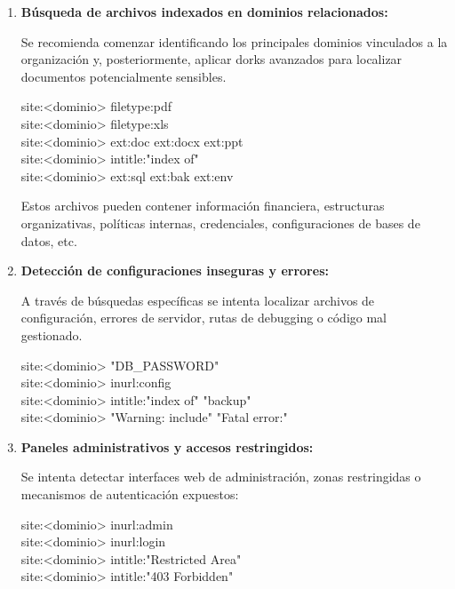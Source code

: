 \documentclass[a4paper, 11pt]{article}
\begin{document}
\begin{enumerate}
    \item \textbf{Búsqueda de archivos indexados en dominios relacionados:}

    Se recomienda comenzar identificando los principales dominios vinculados a la organización y, posteriormente, aplicar dorks avanzados para localizar documentos potencialmente sensibles.

    \begin{tcolorbox}[colback=yellow!20!white, colframe=orange!80!black, title={Dorks para documentos y configuraciones}]
    \small
    site:<dominio> filetype:pdf \\
    site:<dominio> filetype:xls \\
    site:<dominio> ext:doc \textbar{} ext:docx \textbar{} ext:ppt \\
    site:<dominio> intitle:"index of" \\
    site:<dominio> ext:sql \textbar{} ext:bak \textbar{} ext:env
    \end{tcolorbox}

    Estos archivos pueden contener información financiera, estructuras organizativas, políticas internas, credenciales, configuraciones de bases de datos, etc.

    \item \textbf{Detección de configuraciones inseguras y errores:}

    A través de búsquedas específicas se intenta localizar archivos de configuración, errores de servidor, rutas de debugging o código mal gestionado.

 
\begin{tcolorbox}[colback=yellow!20!white, colframe=orange!80!black, title={Dorks para errores y configuraciones expuestas}]
    \small
    site:<dominio> "DB\_PASSWORD" \\
    site:<dominio> inurl:config \\
    site:<dominio> intitle:"index of" "backup" \\
    site:<dominio> "Warning: include" \textbar{} "Fatal error:"
    \end{tcolorbox}

    \item \textbf{Paneles administrativos y accesos restringidos:}

   Se intenta detectar interfaces web de administración, zonas restringidas o mecanismos de autenticación expuestos:

    \begin{tcolorbox}[colback=yellow!20!white, colframe=orange!80!black, title={Dorks para paneles y logins}]
    \small
    site:<dominio> inurl:admin \\
    site:<dominio> inurl:login \\
    site:<dominio> intitle:"Restricted Area" \\
    site:<dominio> intitle:"403 Forbidden"
    \end{tcolorbox}


\end{enumerate}
\end{document}
